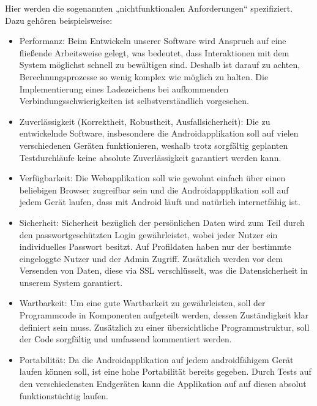 \documentclass[fontsize=12pt,paper=a4,twoside]{scrartcl}
\begin{document}
  Hier werden die sogenannten „nichtfunktionalen Anforderungen“ spezifiziert. Dazu gehören beispielsweise: 
\begin{itemize}
	\item Performanz: Beim Entwickeln unserer Software wird Anspruch auf eine fließende Arbeitsweise gelegt, was bedeutet, dass Interaktionen mit dem System möglichst schnell zu bewältigen sind. Deshalb ist darauf zu achten, Berechnungsprozesse so wenig komplex wie möglich zu halten. Die Implementierung eines Ladezeichens bei aufkommenden Verbindungsschwierigkeiten ist selbstverständlich vorgesehen.
	
	\item Zuverlässigkeit (Korrektheit, Robustheit, Ausfallsicherheit): Die zu entwickelnde Software, insbesondere die Androidapplikation soll auf vielen verschiedenen Geräten funktionieren, weshalb trotz sorgfältig geplanten Testdurchläufe keine absolute Zuverlässigkeit garantiert werden kann. 
	
	\item Verfügbarkeit: Die Webapplikation soll wie gewohnt einfach über einen beliebigen Browser zugreifbar sein und die Androidappplikation soll auf jedem Gerät laufen, dass mit Android läuft und natürlich internetfähig ist. 
	
	\item Sicherheit: Sicherheit bezüglich der persönlichen Daten wird zum Teil durch den passwortgeschützten Login gewährleistet, wobei jeder Nutzer ein individuelles Passwort besitzt. Auf Profildaten haben nur der bestimmte eingeloggte Nutzer und der Admin Zugriff. Zusätzlich werden vor dem Versenden von Daten, diese via SSL verschlüsselt, was die Datensicherheit in unserem System garantiert.
	
	\item Wartbarkeit: Um eine gute Wartbarkeit zu gewährleisten, soll der Programmcode in Komponenten aufgeteilt werden, dessen Zuständigkeit klar definiert sein muss. Zusätzlich zu einer übersichtliche Programmstruktur, soll der Code sorgfältig und umfassend kommentiert werden.
	
	\item Portabilität: Da die Androidapplikation auf jedem androidfähigem Gerät laufen können soll, ist eine hohe Portabilität bereits gegeben. Durch Tests auf den verschiedensten Endgeräten kann die Applikation auf auf diesen absolut funktionstüchtig laufen. 
\end{itemize}
\end{document}
